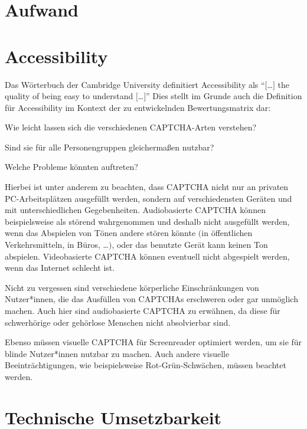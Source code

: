 \section{Aufwand}
\label{ch:matrix:aufwand}


\section{Accessibility}
\label{ch:matrix:accessibility}
Das Wörterbuch der Cambridge University definitiert Accessibility als ``$[$\dots$]$ the quality of being easy to understand $[$\dots$]$'' %
Dies stellt im Grunde auch die Definition für Accessibility im Kontext der zu entwickelnden Bewertungsmatrix dar: 

Wie leicht lassen sich die verschiedenen CAPTCHA-Arten verstehen? 

Sind sie für alle Personengruppen gleichermaßen nutzbar? 

Welche Probleme könnten auftreten?

Hierbei ist unter anderem zu beachten, dass CAPTCHA nicht nur an privaten PC-Arbeitsplätzen ausgefüllt werden, 
sondern auf verschiedensten Geräten und mit unterschiedlichen Gegebenheiten. 
Audiobasierte CAPTCHA können beispielsweise als störend wahrgenommen und deshalb nicht ausgefüllt werden, 
wenn das Abspielen von Tönen andere stören könnte $($in öffentlichen Verkehrsmitteln, in Büros, \dots$)$, 
oder das benutzte Gerät kann keinen Ton abspielen. Videobasierte CAPTCHA können eventuell nicht abgespielt werden, 
wenn das Internet schlecht ist.

Nicht zu vergessen sind verschiedene körperliche Einschränkungen von Nutzer*innen, 
die das Ausfüllen von CAPTCHAs erschweren oder gar unmöglich machen. Auch hier sind audiobasierte CAPTCHA zu erwähnen, 
da diese für schwerhörige oder gehörlose Menschen nicht absolvierbar sind. 

Ebenso müssen visuelle CAPTCHA für Screenreader optimiert werden, um sie für blinde Nutzer*innen nutzbar zu machen. 
Auch andere visuelle Beeinträchtigungen, wie beispielsweise Rot-Grün-Schwächen, müssen beachtet werden.

\section{Technische Umsetzbarkeit}
\label{ch:matrix:tu}


